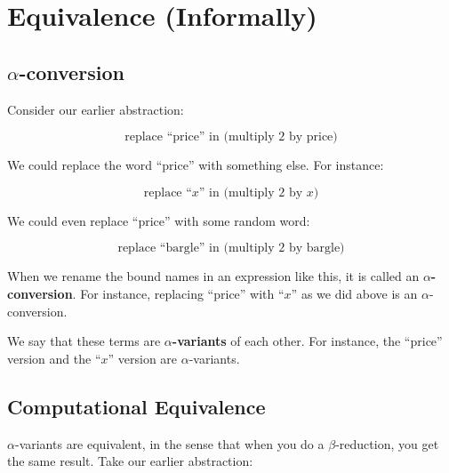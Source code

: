 \documentclass{book}
\numberwithin{equation}{chapter}
\newcommand{\vocab}{\textbf}
\begin{document}
\chapter{Equivalence (Informally)}


\section{$\alpha$-conversion}

Consider our earlier abstraction:

\begin{equation}
\text{replace ``price'' in (multiply 2 by price)}
\end{equation}

\noindent
We could replace the word ``price'' with something else. For instance:

\begin{equation}
\text{replace ``$x$'' in (multiply 2 by $x$)}
\end{equation}

\noindent
We could even replace ``price'' with some random word:

\begin{equation}
\text{replace ``bargle'' in (multiply 2 by bargle)}
\end{equation}

\noindent
When we rename the bound names in an expression like this, it is called an \vocab{$\alpha$-conversion}. For instance, replacing ``price'' with ``$x$'' as we did above is an $\alpha$-conversion. 

We say that these terms are \vocab{$\alpha$-variants} of each other. For instance, the ``price'' version and the ``$x$'' version are $\alpha$-variants.


\section{Computational Equivalence}

$\alpha$-variants are equivalent, in the sense that when you do a $\beta$-reduction, you get the same result. Take our earlier abstraction:
\end{document}
